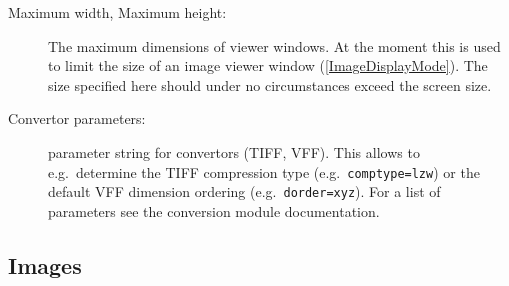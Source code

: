 \documentclass[11pt]{article}
\begin{document}
\begin{description}
\item[Maximum width, Maximum height:] The maximum dimensions of viewer windows.
At the moment this is used to limit the size of an image viewer window (\ref{ImageDisplayMode}).
The size specified here should under no circumstances exceed the screen size.

\item[Convertor parameters:] parameter string for convertors (TIFF, VFF). This allows
to e.g.\ determine the TIFF compression type (e.g.\ \texttt{comptype=lzw}) or the default
VFF dimension ordering (e.g.\ \texttt{dorder=xyz}). For a list of parameters see the
conversion module documentation.
\end{description}

\subsection{Images}
\end{document}
